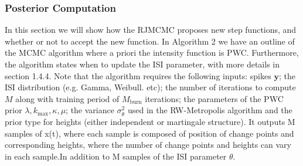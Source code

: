 \documentclass[../main.tex]{subfiles}
\begin{document}
 \subsubsection{Posterior Computation}
In this section we will show how the RJMCMC proposes new step functions, and whether or not to accept the new function.
In Algorithm 2 we have an outline of the MCMC algorithm where a priori the intensity function is PWC. Furthermore, the algorithm states when to update the ISI parameter, with more details in section 1.4.4. Note that the algorithm requires the following inputs: spikes $\mathbf{y}$; the ISI distribution (e.g. Gamma, Weibull. etc); the number of iterations to compute $M$ along with training period of $M_{\mathrm{burn}}$ iterations; the parameters of the PWC prior $\lambda, k_{\mathrm{max}}, \kappa, \mu$; the variance $\sigma^2_\theta$ used in the RW-Metropolis algorithm and the prior type for heights (either independent or martingale structure). It outputs M samples of x(t), where each sample is composed of position of change points and corresponding heights, where the number of change points and heights can vary in each sample.In addition to M samples of the ISI parameter $\theta$.    
\end{document}

